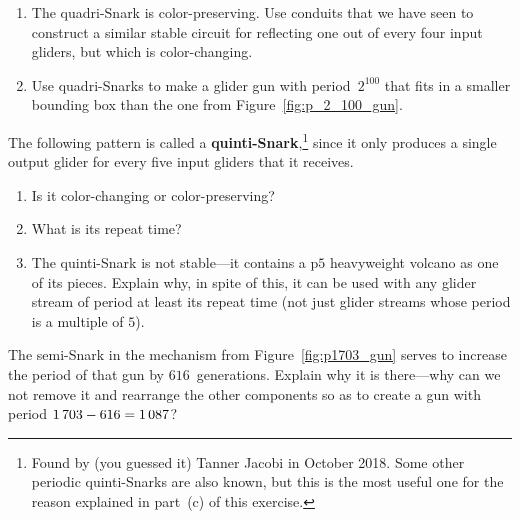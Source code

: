 \begin{multicols}{2}
\begin{problem}
\begin{enumerate}[label=\bf\color{ocre}(\alph*)]
			\item {} The quadri-Snark is color-preserving. Use conduits that we have seen to construct a similar stable circuit for reflecting one out of every four input gliders, but which is color-changing.%
			
			\item {} Use quadri-Snarks to make a glider gun with period~$2^{100}$ that fits in a smaller bounding box than the one from Figure~\ref{fig:p_2_100_gun}.
		\end{enumerate}
	\end{problem}
	
	
	\mfilbreak
	
	
	\begin{problem}\label{exer:quinti_snark}
		The following pattern is called a \textbf{quinti-Snark},\footnote{Found by (you guessed it) Tanner Jacobi in October 2018. Some other periodic quinti-Snarks are also known, but this is the most useful one for the reason explained in part~(c) of this exercise.} since it only produces a single output glider for every five input gliders that it receives.
		
		\begin{center}
		\end{center}
		
		\begin{enumerate}[label=\bf\color{ocre}(\alph*)]
			\item {} Is it color-changing or color-preserving?%
			
			\item {} What is its repeat time?
			
			\item {} The quinti-Snark is not stable---it contains a p$5$ heavyweight volcano as one of its pieces. Explain why, in spite of this, it can be used with any glider stream of period at least its repeat time (not just glider streams whose period is a multiple of $5$).
		\end{enumerate}
	\end{problem}
	
	
	\mfilbreak
	
	
	\begin{problem}\label{exer:p1703_gun_why_semisnark} 
		The semi-Snark in the mechanism from Figure~\ref{fig:p1703_gun} serves to increase the period of that gun by $616$~generations. Explain why it is there---why can we not remove it and rearrange the other components so as to create a gun with period $1{\,}703 - 616 = 1{\,}087$?
	\end{problem}
	

\end{multicols}
